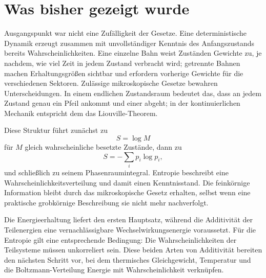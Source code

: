 \begin{classroomqa}
\end{classroomqa}

\section{Was bisher gezeigt wurde}

Ausgangspunkt war nicht eine Zufälligkeit der Gesetze. Eine deterministische Dynamik erzeugt
zusammen mit unvollständiger Kenntnis des Anfangszustands bereits Wahrscheinlichkeiten. Eine einzelne
Bahn weist Zuständen Gewichte zu, je nachdem, wie viel Zeit in jedem Zustand verbracht wird; getrennte
Bahnen machen Erhaltungsgrößen sichtbar und erfordern vorherige Gewichte für die verschiedenen
Sektoren. Zulässige mikroskopische Gesetze bewahren Unterscheidungen. In einem endlichen Zustandsraum
bedeutet das, dass an jedem Zustand genau ein Pfeil ankommt und einer abgeht; in der kontinuierlichen
Mechanik entspricht dem das Liouville-Theorem.

Diese Struktur führt zunächst zu
\begin{equation}
 S=\log M
\end{equation}
für \(M\) gleich wahrscheinliche besetzte Zustände, dann zu
\begin{equation}
 S=-\sum_i p_i\log p_i,
\end{equation}
und schließlich zu seinem Phasenraumintegral. Entropie beschreibt eine Wahrscheinlichkeitsverteilung
und damit einen Kenntnisstand. Die feinkörnige Information bleibt durch das mikroskopische Gesetz
erhalten, selbst wenn eine praktische grobkörnige Beschreibung sie nicht mehr nachverfolgt.

Die Energieerhaltung liefert den ersten Hauptsatz, während die Additivität der Teilenergien eine
vernachlässigbare Wechselwirkungsenergie voraussetzt. Für die Entropie gilt eine entsprechende
Bedingung: Die Wahrscheinlichkeiten der Teilsysteme müssen unkorreliert sein. Diese beiden Arten
von Additivität bereiten den nächsten Schritt vor, bei dem thermisches Gleichgewicht, Temperatur
und die Boltzmann-Verteilung Energie mit Wahrscheinlichkeit verknüpfen.
